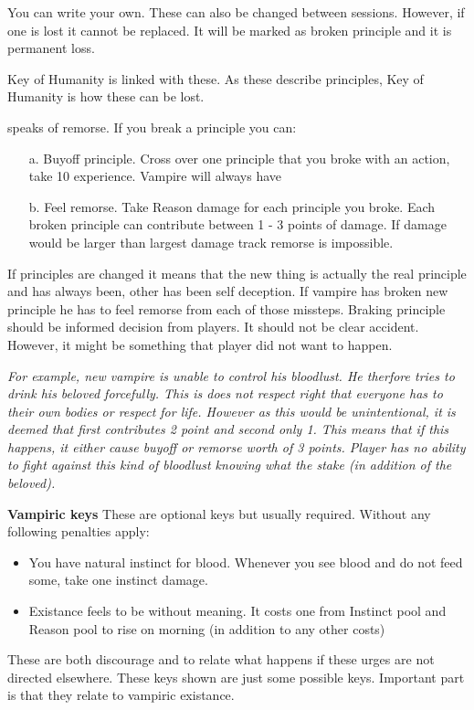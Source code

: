 \documentclass[a4paper, 12pt, finnish]{article}
\begin{document}
{You can write your own. These can also be changed between sessions. However, if one is lost it cannot be replaced. It will be marked as broken principle and it is permanent loss.

Key of Humanity is linked with these. As these describe principles, Key of Humanity is how these can be lost.

\KeyHumanity{}

\KeyNameHumanity{} speaks of remorse. If you break a principle you can:
\begin{itemize}
\item[a.] Buyoff principle. Cross over one principle that you broke with an action, take 10 experience. Vampire will always have \KeyNameHumanity{}
\item[b.] Feel remorse. Take Reason damage for each principle you broke. Each broken principle can contribute between 1 - 3 points of damage. If damage would be larger than largest damage track remorse is impossible.
\end{itemize}

If principles are changed it means that the new thing is actually the real principle and has always been, other has been self deception.
If vampire has broken new principle he has to feel remorse from each of those missteps.
Braking principle should be informed decision from players.
It should not be clear accident.
However, it might be something that player did not want to happen.

\textit{For example, new vampire is unable to control his bloodlust. He therfore tries to drink his beloved forcefully. This is does not respect right that everyone has to their own bodies or respect for life. However as this would be unintentional, it is deemed that first contributes 2 point and second only 1. This means that if this happens, it either cause buyoff or remorse worth of 3 points.
Player has no ability to fight against this kind of bloodlust knowing what the stake (in addition of the beloved).}

\pagebreak
\textbf{Vampiric keys}
These are optional keys but usually required. Without any following penalties apply:
\begin{itemize}
\setlength\itemsep{-2pt}
\item You have natural instinct for blood. Whenever you see blood and do not feed some, take one instinct damage.
\item Existance feels to be without meaning. It costs one from Instinct pool and Reason pool to rise on morning (in addition to any other costs)
\end{itemize}
These are both discourage and to relate what happens if these urges are not directed elsewhere.
These keys shown are just some possible keys.
Important part is that they relate to vampiric existance.

}
\end{document}
